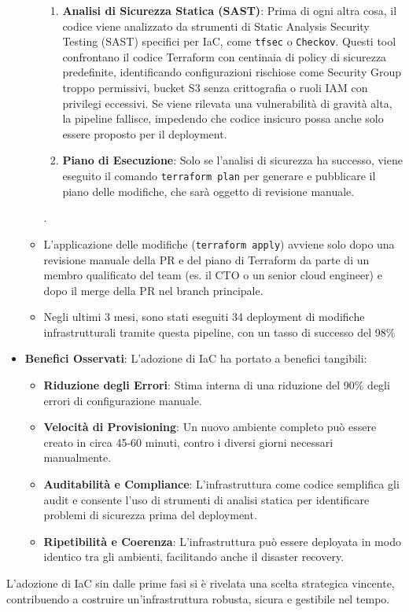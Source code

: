 \begin{itemize}
\begin{itemize}
\begin{enumerate}
        \item \textbf{Analisi di Sicurezza Statica (SAST)}: Prima di ogni altra cosa, il codice viene analizzato da strumenti di Static Analysis Security Testing (SAST) specifici per IaC, come \texttt{tfsec} o \texttt{Checkov}. Questi tool confrontano il codice Terraform con centinaia di policy di sicurezza predefinite, identificando configurazioni rischiose come Security Group troppo permissivi, bucket S3 senza crittografia o ruoli IAM con privilegi eccessivi. Se viene rilevata una vulnerabilità di gravità alta, la pipeline fallisce, impedendo che codice insicuro possa anche solo essere proposto per il deployment.
        \item \textbf{Piano di Esecuzione}: Solo se l'analisi di sicurezza ha successo, viene eseguito il comando \texttt{terraform plan} per generare e pubblicare il piano delle modifiche, che sarà oggetto di revisione manuale.
        \end{enumerate}.
        \item L'applicazione delle modifiche (\texttt{terraform apply}) avviene solo dopo una revisione manuale della PR e del piano di Terraform da parte di un membro qualificato del team (es. il CTO o un senior cloud engineer) e dopo il merge della PR nel branch principale.
        \item Negli ultimi 3 mesi, sono stati eseguiti 34 deployment di modifiche infrastrutturali tramite questa pipeline, con un tasso di successo del 98\%
    \end{itemize}
    \item \textbf{Benefici Osservati}: L'adozione di IaC ha portato a benefici tangibili:
    \begin{itemize}
        \item \textbf{Riduzione degli Errori}: Stima interna di una riduzione del 90\% degli errori di configurazione manuale.
        \item \textbf{Velocità di Provisioning}: Un nuovo ambiente completo può essere creato in circa 45-60 minuti, contro i diversi giorni necessari manualmente.
        \item \textbf{Auditabilità e Compliance}: L'infrastruttura come codice semplifica gli audit e consente l'uso di strumenti di analisi statica per identificare problemi di sicurezza prima del deployment.
        \item \textbf{Ripetibilità e Coerenza}: L'infrastruttura può essere deployata in modo identico tra gli ambienti, facilitando anche il disaster recovery.
    \end{itemize}
\end{itemize}
L'adozione di IaC sin dalle prime fasi si è rivelata una scelta strategica vincente, contribuendo a costruire un'infrastruttura robusta, sicura e gestibile nel tempo.

